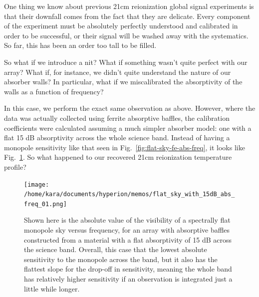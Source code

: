 One thing we know about previous 21cm reionization global signal experiments is 
that their downfall comes from the fact that they are delicate. Every component 
of the experiment must be absolutely perfectly understood and calibrated in 
order to be successful, or their signal will be washed away with the 
systematics. So far, this has been an order too tall to be filled.

So what if we introduce a nit? What if something wasn't quite perfect with our 
array? What if, for instance, we didn't quite understand the nature of our 
absorber walls? In particular, what if we miscalibrated the absorptivity of the 
walls as a function of frequency?

In this case, we perform the exact same observation as above. However, where 
the data was actually collected using ferrite absorptive baffles, the 
calibration coefficients were calculated assuming a much simpler absorber 
model: one with a flat 15 dB absorptivity across the whole science band.  
Instead of having a monopole sensitivity like that seen in 
Fig.~\ref{fig:flat-sky-fe-abs-freq}, it looks like 
Fig.~\ref{fig:flat-sky-15dB-abs-freq}. So what happened to our recovered 21cm 
reionization temperature profile?

\begin{figure}
    \begin{center}
    \texttt{[image: /home/kara/documents/hyperion/memos/flat\_sky\_with\_15dB\_abs\_freq\_01.png]}
    \end{center}
    \caption{
        Shown here is the absolute value of the visibility of a spectrally flat 
        monopole sky versus frequency, for an array with absorptive baffles 
        constructed from a material with a flat absorptivity of 15 dB across 
        the science band. Overall, this case that the lowest absolute 
        sensitivity to the monopole across the band, but it also has the 
        flattest slope for the drop-off in sensitivity, meaning the whole band 
        has relatively higher sensitivity if an observation is integrated just 
        a little while longer.
    }
    \label{fig:flat-sky-15dB-abs-freq}
\end{figure}

